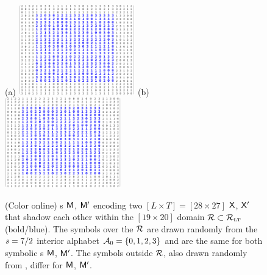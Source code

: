 \documentclass[12pt]{iopart}
\begin{document}
\begin{figure}
\begin{center}
(a) \includegraphics[width=0.45\textwidth]
{AKSs7BlockBorderM1} %
(b) \includegraphics[width=0.45\textwidth]
{AKSs7BlockBorderM2}                 %
\end{center}
\caption[]{
(Color online)
{\Brick s} $\mathsf{M}$, $\mathsf{M}'$ encoding  two $[L\!\times\!T] = [28 \times 27]$
{\twots} $\mathsf{X}$, $\mathsf{X}'$ that shadow each other within the $[19\times 20]$
domain $\mathcal{R}\subset \mathcal{R}_{\scriptscriptstyle\mathrm{LT}}$ (bold/blue).
The symbols  over the $\mathcal{R}$ are  drawn randomly from the $s=7/2$ interior
alphabet $\mathcal{A}_0=\{0,1,2,3\}$ and are the same for both symbolic {\brick s}
$\mathsf{M}$, $\mathsf{M}'$. The symbols outside $\mathcal{R}$, also drawn randomly from \Ai,
differ for $\mathsf{M}$, $\mathsf{M}'$.
}
\label{fig:BGcloseActSymb}  %
\end{figure}
\end{document}
